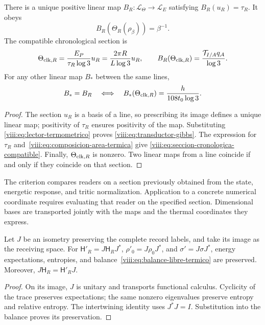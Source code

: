 \begin{theorem}
\label{viii:thm:identificacion-transductor}
There is a unique positive linear map
\(B_R:\mathcal L_\Theta\to\mathcal L_E\) satisfying
\(B_R(u_R)=\tau_R\). It obeys
\begin{equation}
 B_R(\Theta_R(\rho_\beta))=\beta^{-1}.
 \label{viii:eq:transductor-gibbs}
\end{equation}
The compatible chronological section is
\begin{equation}
 \Theta_{{\rm clk},R}
 =\frac{E_P}{\tau_R\log3}u_R
 =\frac{2\pi R}{L\log3}u_R,
 \qquad
 B_R(\Theta_{{\rm clk},R})=
 \frac{\mathcal T_{I/A}q_{\mathcal A}}{\log3}.
 \label{viii:eq:seccion-cronologica-compatible}
\end{equation}
For any other linear map \(B_*\) between the same lines,
\begin{equation}
 B_*=B_R
 \quad\Longleftrightarrow\quad
 B_*(\Theta_{{\rm clk},R})=\frac{h}{108t_0\log3}.
 \label{viii:eq:criterio-una-seccion}
\end{equation}
\end{theorem}
\begin{proof}
The section \(u_R\) is a basis of a line, so prescribing its
image defines a unique linear map; positivity of \(\tau_R\)
ensures positivity of the map. Substituting
\eqref{viii:eq:lector-termometrico} proves
\eqref{viii:eq:transductor-gibbs}. The expression for \(\tau_R\)
and~\eqref{viii:eq:composicion-area-termica} give
\eqref{viii:eq:seccion-cronologica-compatible}. Finally,
\(\Theta_{{\rm clk},R}\) is nonzero. Two linear maps from a line
coincide if and only if they coincide on that section.
\end{proof}

The criterion compares readers on a section previously obtained from
the state, energetic response, and tritic normalization. Application to
a concrete numerical coordinate requires evaluating that reader on
the specified section. Dimensional bases are transported jointly with
the maps and the thermal coordinates they express.

\begin{proposition}
\label{viii:prop:transporte-termico-memoria}
Let \(J\) be an isometry preserving the complete record labels,
and take its image as the receiving space. For
\(\mathsf H'_R=J\mathsf H_RJ^*\), \(\rho'_0=J\rho_0J^*\),
and \(\sigma'=J\sigma J^*\), energy expectations, entropies, and
balance~\eqref{viii:eq:balance-libre-termico} are preserved.
Moreover, \(J\mathsf H_R=\mathsf H'_RJ\).
\end{proposition}
\begin{proof}
On its image, \(J\) is unitary and transports functional calculus.
Cyclicity of the trace preserves expectations; the same nonzero
eigenvalues preserve entropy and relative entropy. The intertwining
identity uses \(J^*J=I\). Substitution into the balance proves its
preservation.
\end{proof}

